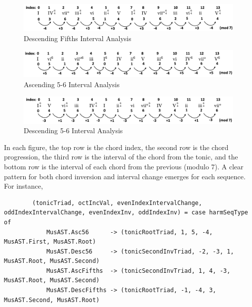 \documentclass{report}
\begin{document}
\begin{figure}[h!]
\centering
\includegraphics[width=\textwidth]{images/desc_fifths_intervals}
  \caption{Descending Fifths Interval Analysis}
\end{figure}

\begin{figure}[h!]
\centering
\includegraphics[width=\textwidth]{images/asc_56_intervals}
  \caption{Ascending 5-6 Interval Analysis}
\end{figure}

\begin{figure}[h!]
\centering
\includegraphics[width=\textwidth]{images/desc_56_intervals}
  \caption{Descending 5-6 Interval Analysis}
\end{figure}

In each figure, the top row is the chord index, the second row is the chord progression, the third row is the interval of the chord from the tonic, and the bottom row is the interval of each chord from the previous (modulo 7). A clear pattern for both chord inversion and interval change emerges for each sequence. For instance, 

\begin{verbatim}
        (tonicTriad, octIncVal, evenIndexIntervalChange, oddIndexIntervalChange, evenIndexInv, oddIndexInv) = case harmSeqType of 
            MusAST.Asc56      -> (tonicRootTriad, 1, 5, -4, MusAST.First, MusAST.Root)
            MusAST.Desc56     -> (tonicSecondInvTriad, -2, -3, 1, MusAST.Root, MusAST.Second)
            MusAST.AscFifths  -> (tonicSecondInvTriad, 1, 4, -3, MusAST.Root, MusAST.Second)
            MusAST.DescFifths -> (tonicRootTriad, -1, -4, 3, MusAST.Second, MusAST.Root)
\end{verbatim}
\end{document}
